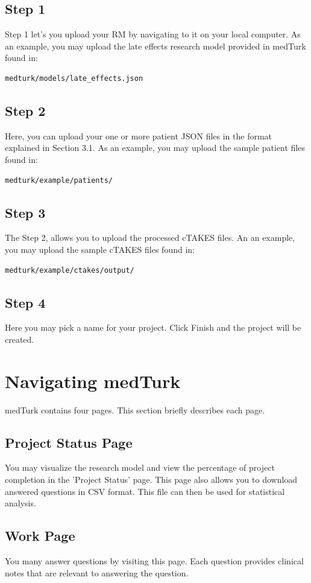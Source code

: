 \documentclass{book}
\begin{document}
\subsection*{Step 1}
Step 1 let's you upload your RM by navigating to it on your local computer. As an example, you may upload the late effects research model provided in medTurk found in:

\begin{verbatim}
medturk/models/late_effects.json
\end{verbatim}


\subsection*{Step 2}
Here, you can upload your one or more patient JSON files in the format explained in Section 3.1. As an example, you may upload the sample patient files found in:
\begin{verbatim}
medturk/example/patients/
\end{verbatim}


\subsection*{Step 3}
The Step 2, allows you to upload the processed cTAKES files. An an example, you may upload the sample cTAKES files found in:
\begin{verbatim}
medturk/example/ctakes/output/
\end{verbatim}

\subsection*{Step 4}
Here you may pick a name for your project. Click Finish and the project will be created.
\\
\section{Navigating medTurk}
medTurk contains four pages. This section briefly describes each page.

\subsection*{Project Status Page}
You may visualize the research model and view the percentage of project completion in the 'Project Status' page. This page also allows you to download answered questions in CSV format. This file can then be used for statistical analysis. 


\subsection*{Work Page}
You many answer questions by visiting this page. Each question provides clinical notes that are relevant to answering the question. 
\end{document}
